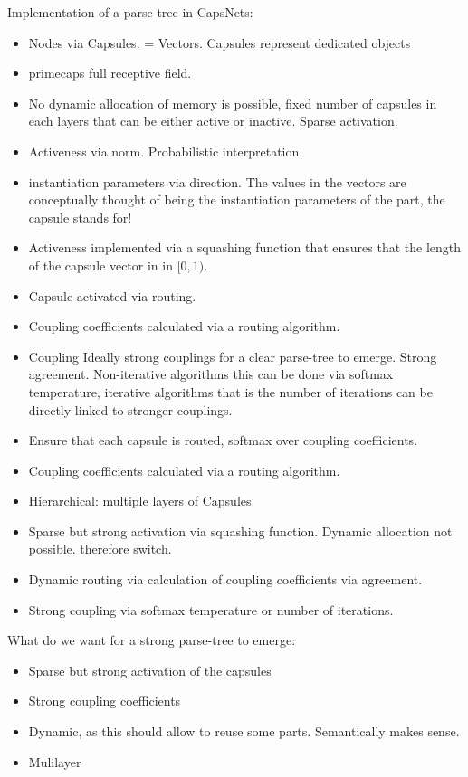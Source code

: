 \documentclass{article}
\begin{document}
Implementation of a parse-tree in CapsNets:
\begin{itemize}
	\item Nodes via Capsules. = Vectors. Capsules represent dedicated objects
	\item primecaps full receptive field.
	\item No dynamic allocation of memory is possible, fixed number of capsules in each layers that can be either active or inactive. Sparse activation.
	\item Activeness via norm. Probabilistic interpretation.
	\item instantiation parameters via direction. The values in the vectors are conceptually thought of being the instantiation parameters of the part, the capsule stands for!
	\item Activeness implemented via a squashing function that ensures that the length of the capsule vector in in $[0,1)$.
	\item Capsule activated via routing.
	\item Coupling coefficients calculated via a routing algorithm.
	\item Coupling Ideally strong couplings for a clear parse-tree to emerge. Strong agreement. Non-iterative algorithms this can be done via softmax temperature, iterative algorithms that is the number of iterations can be directly linked to stronger couplings.
	\item Ensure that each capsule is routed, softmax over coupling coefficients.
	\item Coupling coefficients calculated via a routing algorithm.
	\item Hierarchical: multiple layers of Capsules.
	\item Sparse but strong activation via squashing function. Dynamic allocation not possible. therefore switch.
	\item Dynamic routing via calculation of coupling coefficients via agreement.
	\item Strong coupling via softmax temperature or number of iterations.
\end{itemize}

What do we want for a strong parse-tree to emerge:
\begin{itemize}
	\item Sparse but strong activation of the capsules
	\item Strong coupling coefficients
	\item Dynamic, as this should allow to reuse some parts. Semantically makes sense.
	\item Mulilayer
\end{itemize}
\end{document}
